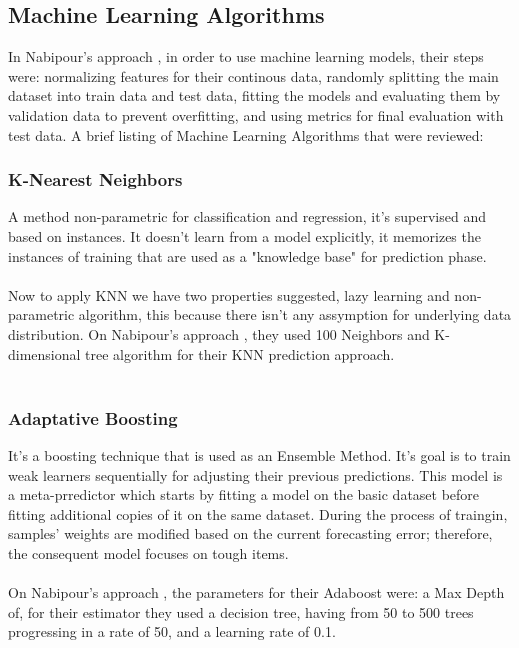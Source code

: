 \documentclass[conference]{IEEEtran}
\begin{document}
\subsection{Machine Learning Algorithms}
In Nabipour's approach \cite{nabipour2020predicting}, in order to use machine learning models, their steps were:  normalizing features for their continous data, randomly splitting the main dataset into train data
and test data, fitting the models and evaluating them by validation data to prevent overfitting, and using metrics for final evaluation with test data.
A brief listing of Machine Learning Algorithms that were reviewed:
\subsubsection{K-Nearest Neighbors}
A method non-parametric for classification and regression, it's supervised and based on instances. It doesn't learn from a model explicitly, it memorizes
the instances of training that are used as a "knowledge base" for prediction phase.
\\\\
Now to apply KNN we have two properties suggested, lazy learning and non-parametric algorithm, this because there isn't any assymption for underlying data distribution.
On Nabipour's approach \cite{nabipour2020predicting}, they used 100 Neighbors and K-dimensional tree algorithm for their KNN prediction approach.
\\\\
\subsubsection{Adaptative Boosting}
It's a boosting technique that is used as an Ensemble Method. It's goal is to train weak learners sequentially for adjusting their previous predictions. This model is a 
meta-prredictor which starts by fitting a model on the basic dataset before fitting additional copies of it on the same dataset. During the process of traingin, samples' weights are modified based on the current 
forecasting error; therefore, the consequent model focuses on tough items.
\\\\
On Nabipour's approach \cite{nabipour2020predicting}, the parameters for their Adaboost were: a Max Depth of, for their estimator they used a decision tree, having from 50 to 500 trees progressing in a rate of 50, and a learning rate of 0.1.
\\\\
\end{document}

